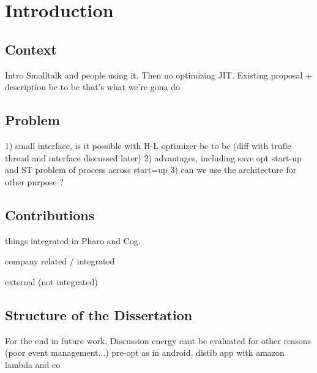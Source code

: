 \documentclass[a4paper,12pt,twoside]{../includes/ThesisStyle}
\begin{document}
\fi

\chapter{Introduction}
\label{chap:intro}
\minitoc

\section{Context}

Intro Smalltalk and people using it.
Then no optimizing JIT.
Existing proposal + description bc to bc
that's what we're gona do

\section{Problem}

1) small interface, is it possible with  H-L optimizer bc to bc (diff with trufle thread and interface discussed later)
2) advantages, including save opt start-up and ST problem of process across start=up
3) can we use the architecture for other purpose ?

\section{Contributions}

things integrated in Pharo and Cog.

company related / integrated

external (not integrated)

\section{Structure of the Dissertation}



For the end in future work.
Discussion energy cant be evaluated for other reasons (poor event management...) pre-opt as in android, distib app with amazon lambda and co

\ifx\wholebook\relax\else
    
\end{document}
